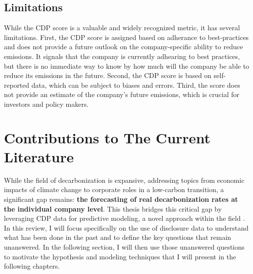 \subsection{Limitations}


\noindent While the CDP score is a valuable and widely recognized metric, it has several limitations. First, the CDP score is assigned based on adherance to best-practices and does not provide a future outlook on the company-specific ability to reduce emissions. It signals that the company is currently adhearing to best practices, but there is no immediate way to know by how much will the company be able to reduce its emissions in the future. Second, the CDP score is based on self-reported data, which can be subject to biases and errors. Third, the score does not provide an estimate of the company's future emissions, which is crucial for investors and policy makers. 


\section{Contributions to The Current Literature}
\noindent While the field of decarbonization is expansive, addressing topics from economic impacts of climate change to corporate roles in a low-carbon transition, a significant gap remains: \textbf{the forecasting of real decarbonization rates at the individual company level}. This thesis bridges this critical gap by leveraging CDP data for predictive modeling, a novel approach within the field \cite{nguyen-ml, ben-amar, teob, Hassan2013Carbon}. In this review, I will focus specifically on the use of disclosure data to understand what has been done in the past and to define the key questions that remain unanswered. In the following section, I will then use those unanswered questions to motivate the hypothesis and modeling techniques that I will present in the following chapters.


